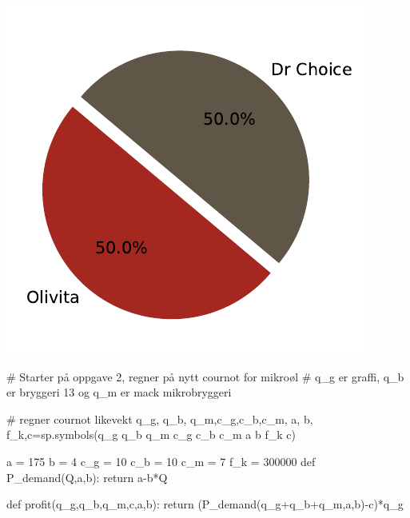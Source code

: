 \documentclass[
  12pt,
  a4paper,
  DIV=11,
  numbers=noendperiod]{scrartcl}
\newenvironment{Shaded}{\begin{snugshade}}{\end{snugshade}}
\newcommand{\CommentTok}[1]{\textcolor[rgb]{0.37,0.37,0.37}{#1}}
\newcommand{\ControlFlowTok}[1]{\textcolor[rgb]{0.00,0.23,0.31}{#1}}
\newcommand{\DecValTok}[1]{\textcolor[rgb]{0.68,0.00,0.00}{#1}}
\newcommand{\KeywordTok}[1]{\textcolor[rgb]{0.00,0.23,0.31}{#1}}
\newcommand{\NormalTok}[1]{\textcolor[rgb]{0.00,0.23,0.31}{#1}}
\newcommand{\OperatorTok}[1]{\textcolor[rgb]{0.37,0.37,0.37}{#1}}
\newcommand{\StringTok}[1]{\textcolor[rgb]{0.13,0.47,0.30}{#1}}
\begin{document}
\includegraphics{Kandidatnummer_30_mappeoppgave_2_SOK_2030_files/figure-pdf/cell-19-output-1.pdf}

\begin{Shaded}
\begin{Highlighting}[]
\CommentTok{\# Starter på oppgave 2, regner på nytt cournot for mikroøl}
\CommentTok{\# q\_g er graffi, q\_b er bryggeri 13 og q\_m er mack mikrobryggeri}

\CommentTok{\# regner cournot likevekt}
\NormalTok{q\_g, q\_b, q\_m,c\_g,c\_b,c\_m, a, b, f\_k,c}\OperatorTok{=}\NormalTok{sp.symbols(}\StringTok{\textquotesingle{}q\_g q\_b q\_m c\_g c\_b c\_m a b f\_k c\textquotesingle{}}\NormalTok{)}

\NormalTok{a }\OperatorTok{=} \DecValTok{175}
\NormalTok{b }\OperatorTok{=} \DecValTok{4}
\NormalTok{c\_g }\OperatorTok{=} \DecValTok{10}
\NormalTok{c\_b }\OperatorTok{=} \DecValTok{10}
\NormalTok{c\_m }\OperatorTok{=} \DecValTok{7}
\NormalTok{f\_k }\OperatorTok{=} \DecValTok{300000}
\KeywordTok{def}\NormalTok{ P\_demand(Q,a,b):}
    \ControlFlowTok{return}\NormalTok{ a}\OperatorTok{{-}}\NormalTok{b}\OperatorTok{*}\NormalTok{Q}

\KeywordTok{def}\NormalTok{ profit(q\_g,q\_b,q\_m,c,a,b):}
    \ControlFlowTok{return}\NormalTok{ (P\_demand(q\_g}\OperatorTok{+}\NormalTok{q\_b}\OperatorTok{+}\NormalTok{q\_m,a,b)}\OperatorTok{{-}}\NormalTok{c)}\OperatorTok{*}\NormalTok{q\_g}
\end{Highlighting}
\end{Shaded}
\end{document}
